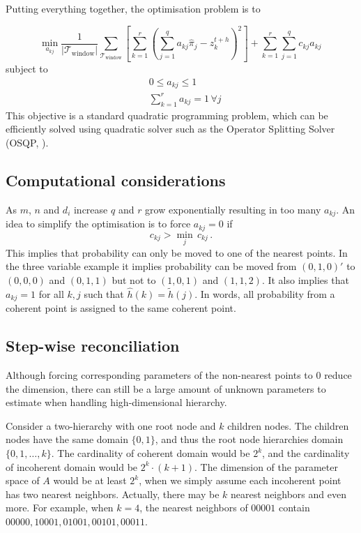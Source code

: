\documentclass[a4paper,review,12pt,authoryear]{elsarticle}
\begin{document}
    Putting everything together, the optimisation problem is to 
    
    \[
    \underset{a_{kj}}{\min} \frac{1}{|\mathcal{T}_{\textrm{window}}|}\sum\limits_{\mathcal{T}_{\textrm{window}}}\left[\sum\limits_{k=1}^r\left(\sum\limits_{j=1}^q a_{kj}\hat{{\pi}}_j-z^{t+h}_k\right)^2\right] + \sum\limits_{k=1}^r\sum\limits_{j=1}^q c_{kj}a_{kj}\,
    \]
    subject to
    \begin{align*}
    &0\leq a_{kj}\leq 1\\
    &\sum\limits_{k=1}^r a_{kj} = 1 \,\forall j
    \end{align*}
    This objective is a standard quadratic programming problem, which can be efficiently solved using quadratic solver such as the Operator Splitting Solver (OSQP, \citealp{stellatoOSQPOperatorSplitting2020}).   

    
    \subsection{Computational considerations}
    
    As $m$, $n$ and $d_i$ increase $q$ and $r$ grow exponentially resulting in too many $a_{kj}$. An idea to simplify the optimisation is to force $a_{kj}=0$ if 
    \[
     c_{kj}>\underset{j}{\min}\,c_{kj}\,.
    \]  
    This implies that probability can only be moved to one of the nearest points. In the three variable example it implies probability can be moved from $(0,1,0)'$ to $(0,0,0)$ and $(0,1,1)$ but not to $(1,0,1)$ and $(1,1,2)$. It also implies that $a_{kj}=1$ for all $k,j$ such that $\hat{h}(k)=\tilde{h}(j)$. In words, all probability from a coherent point is assigned to the same coherent point.

   \subsection{Step-wise reconciliation}

   Although forcing corresponding parameters of the non-nearest points to 0 reduce the dimension, there can still be a large amount of unknown parameters to estimate when handling high-dimensional hierarchy. 
   
   Consider a two-hierarchy with one root node and $k$ children nodes. 
   The children nodes have the same domain $\{0, 1\}$, and thus the root node hierarchies domain $\{0, 1, \dots, k\}$.
   The cardinality of coherent domain would be $2^k$, and the cardinality of incoherent domain would be $2^k\cdot (k+1)$. 
   The dimension of the parameter space of $A$ would be at least $2^k$, when we simply assume each incoherent point has two nearest neighbors. Actually, there may be $k$ nearest neighbors and even more. For example, when $k=4$, the nearest neighbors of $00001$ contain $00000, 10001, 01001, 00101, 00011$.
\end{document}
